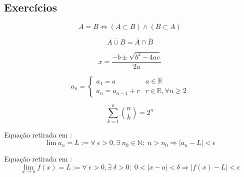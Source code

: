 \subsection{Exerc\'{i}cios}

\begin{prob}
\label{prob1}
\begin{equation*}
    A = B \Leftrightarrow (A \subset B) \wedge (B \subset A)
\end{equation*}
\end{prob}

\begin{prob}
\label{prob2}
\begin{equation*}
    \overline{A \cup B} = \overline{A} \cap \overline{B}
\end{equation*}
\end{prob}

\begin{prob}
\label{prob3}
\begin{equation*}
    \boxed{x = \frac{-b\pm\sqrt{b^{2}-4ac}}{2a}}
\end{equation*}
\end{prob}

\begin{prob}
\label{prob4}
\begin{equation*}
    a_n = \begin{cases}
                a_1 = a & a\in\mathbb{R}\\
                a_n = a_{n-1} + r & r\in\mathbb{R},\forall n \ge 2
               \end{cases}
\end{equation*}
\end{prob}

\begin{prob}
\label{prob5}
\begin{equation*}
    \sum\limits_{k=1}^{n}\binom{n}{k} = 2^{n}
\end{equation*}
\end{prob}

\begin{prob}
\label{prob6}
Equação retirada em \cite{Elon}:
\begin{equation*}
    \lim a_{n} = L := \forall\;\epsilon > 0,\exists\;n_{0}\in\mathbb{N};\;n>n_{0}\Rightarrow|a_{n}-L|<\epsilon
\end{equation*}
\end{prob}

\begin{prob}
\label{prob7}
Equação retirada em \cite{Elon}:
\begin{equation*}
    \lim\limits_{x\to a} f(x) = L := \forall\;\epsilon > 0,\exists\;\delta>0;\;0<|x-a|<\delta\Rightarrow|f(x)-L|<\epsilon
\end{equation*}
\end{prob}

